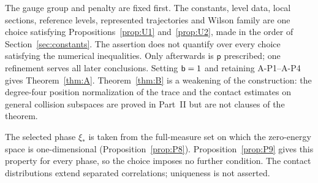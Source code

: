 \begin{remark}
The gauge group and penalty are fixed first. The constants, level data, local sections, reference levels, represented trajectories and Wilson family are one choice satisfying Propositions~\ref{prop:U1} and~\ref{prop:U2}, made in the order of Section~\ref{sec:constants}. The assertion does not quantify over every choice satisfying the numerical inequalities. Only afterwards is $\mathsf p$ prescribed; one refinement serves all later conclusions. Setting $\mathsf{b}=1$ and retaining A-P1--A-P4 gives Theorem~\ref{thm:A}. Theorem~\ref{thm:B} is a weakening of the construction: the degree-four position normalization of the trace and the contact estimates on general collision subspaces are proved in Part~II but are not clauses of the theorem.
\end{remark}

\begin{remark}
The selected phase $\xi_*$ is taken from the full-measure set on which the zero-energy space is one-dimensional (Proposition~\ref{prop:P8}). Proposition~\ref{prop:P9} gives this property for every phase, so the choice imposes no further condition. The contact distributions extend separated correlations; uniqueness is not asserted.
\end{remark}
